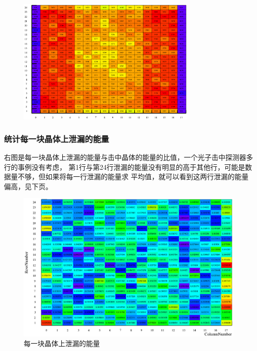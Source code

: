 \documentclass{beamer}
\newcommand{\liuhao}{\fontsize{7.875pt}{\baselineskip}\selectfont}
\newcommand{\qihao}{\fontsize{5.25pt}{\baselineskip}\selectfont}
\begin{document}
\begin{CJK*}{UTF8}{gkai}
\begin{frame}
\begin{minipage}[t]{0.8\textwidth}
\begin{figure}[ht]
	\includegraphics[width=0.78\textwidth]{SingleEnergyWaterDirectNumber.eps}
      \end{figure}
    \end{minipage}
  \end{frame}
  \begin{frame}\frametitle{统计每一块晶体上泄漏的能量}
    \begin{minipage}[t]{0.25\textwidth}
      \liuhao
      右图是每一块晶体上泄漏的能量与击中晶体的能量的比值，一个光子击中探测器多行的事例没有考虑，
      第1行与第24行泄漏的能量没有明显的高于其他行，可能是数据量不够，但如果将每一行泄漏的能量求
      平均值，就可以看到这两行泄漏的能量偏高，见下页。
    \end{minipage}
    \begin{minipage}[t]{0.7\textwidth}
      \begin{figure}[ht]
        \includegraphics[width=\textwidth]{EscapeCrystalRatio.eps}
	\caption{\qihao 每一块晶体上泄漏的能量}
      \end{figure}
    \end{minipage}
  \end{frame}

\end{CJK*}
\end{document}
